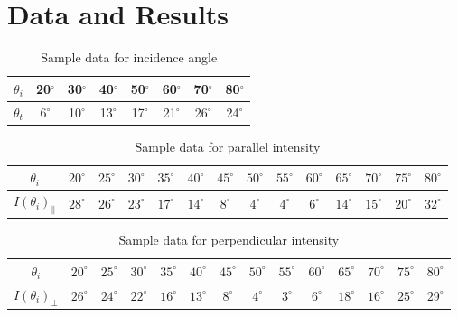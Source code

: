 \documentclass[a4paper,12pt]{report}
\begin{document}
\chapter{Data and Results}
\begin{table}[h]
	\begin{center}
\begin{tabular}{|c||c|c|c|c|c|c|c|}
	\hline $\theta_{i}$ & 20$^{\circ}$ & 30$^{\circ}$ & 40$^{\circ}$ & 50$^{\circ}$ & 60$^{\circ}$ & 70$^{\circ}$ & 80$^{\circ}$ \\ 
	\hline $\theta_{t}$ & 6$^{\circ}$ & 10$^{\circ}$ & 13$^{\circ}$ & 17$^{\circ}$ & 21$^{\circ}$ & 26$^{\circ}$ & 24$^{\circ}$ \\ 
	\hline 
\end{tabular} 
\end{center}
\caption{Sample data for incidence angle} 
\end{table}
\begin{table}[h]
	\begin{center}
\begin{tabular}{|c||c|c|c|c|c|c|c|c|c|c|c|c|c|}
	\hline $\theta_{i}$ & $20^{\circ}$ & $25^{\circ}$ & $30^{\circ}$ & $35^{\circ}$ & $40^{\circ}$ & $45^{\circ}$ & $50^{\circ}$ & $55^{\circ}$ & $60^{\circ}$ & $65^{\circ}$ & $70^{\circ}$ & $75^{\circ}$ & $80^{\circ}$ \\ 
	\hline $I(\theta_{i})_{\parallel}$ & $28^{\circ}$ & $26^{\circ}$ & $23^{\circ}$ & $17^{\circ}$ & $14^{\circ}$ & $8^{\circ}$ & $4^{\circ}$ & $4^{\circ}$ & $6^{\circ}$ & $14^{\circ}$ & $15^{\circ}$ & $20^{\circ}$ & $32^{\circ}$ \\ 
	\hline 
\end{tabular} 
\end{center}
\caption{Sample data for parallel intensity} 
\end{table}
\begin{table}[h]
	\begin{center}
		\begin{tabular}{|c||c|c|c|c|c|c|c|c|c|c|c|c|c|}
			\hline $\theta_{i}$ & $20^{\circ}$ & $25^{\circ}$ & $30^{\circ}$ & $35^{\circ}$ & $40^{\circ}$ & $45^{\circ}$ & $50^{\circ}$ & $55^{\circ}$ & $60^{\circ}$ & $65^{\circ}$ & $70^{\circ}$ & $75^{\circ}$ & $80^{\circ}$ \\ 
			\hline $I(\theta_{i})_{\perp}$ & $26^{\circ}$ & $24^{\circ}$ & $22^{\circ}$ & $16^{\circ}$ & $13^{\circ}$ & $8^{\circ}$ & $4^{\circ}$ & $3^{\circ}$ & $6^{\circ}$ & $18^{\circ}$ & $16^{\circ}$ & $25^{\circ}$ & $29^{\circ}$ \\ 
			\hline 
		\end{tabular} 
	\end{center}
	\caption{Sample data for perpendicular intensity} 
\end{table}
\end{document}
